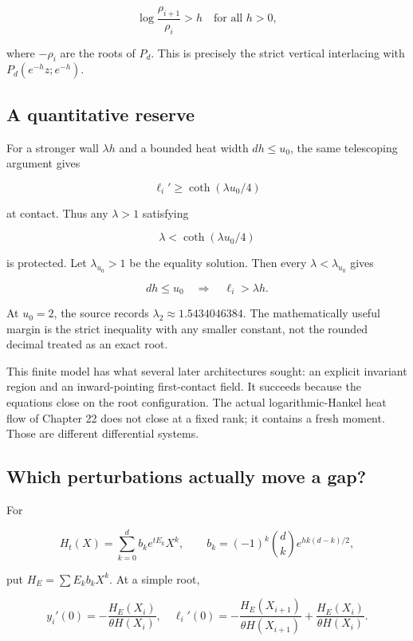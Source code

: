 \documentclass[
  10pt,
  a4paper,
  10pt,
  oneside,
  openany]{book}
\begin{document}
\[
 \log\frac{\rho_{i+1}}{\rho_i}>h
 \quad\text{for all }h>0,
 \tag{30.6}\label{eq:30.6}
\]

where \(-\rho_i\) are the roots of \(P_d\). This is precisely the strict
vertical interlacing with \(P_d(e^{-h}z;e^{-h})\).

\subsection{A quantitative reserve}\label{a-quantitative-reserve}

For a stronger wall \(\lambda h\) and a bounded heat width
\(dh\le u_0\), the same telescoping argument gives

\[
 \ell_i'\ge\coth(\lambda u_0/4)
\]

at contact. Thus any \(\lambda>1\) satisfying

\[
 \lambda<\coth(\lambda u_0/4)
\]

is protected. Let \(\lambda_{u_0}>1\) be the equality solution. Then
every \(\lambda<\lambda_{u_0}\) gives

\[
 dh\le u_0\quad\Longrightarrow\quad\ell_i>\lambda h.
 \tag{30.7}\label{eq:30.7}
\]

At \(u_0=2\), the source records \(\lambda_2\approx1.5434046384\). The
mathematically useful margin is the strict inequality with any smaller
constant, not the rounded decimal treated as an exact root.

This finite model has what several later architectures sought: an
explicit invariant region and an inward-pointing first-contact field. It
succeeds because the equations close on the root configuration. The
actual logarithmic-Hankel heat flow of Chapter 22 does not close at a
fixed rank; it contains a fresh moment. Those are different differential
systems.

\subsection{Which perturbations actually move a
gap?}\label{which-perturbations-actually-move-a-gap}

For

\[
 H_t(X)=\sum_{k=0}^db_ke^{tE_k}X^k,
 \qquad b_k=(-1)^k\binom dk e^{hk(d-k)/2},
\]

put \(H_E=\sum E_kb_kX^k\). At a simple root,

\[
 y_i'(0)=-\frac{H_E(X_i)}{\theta H(X_i)},
 \quad
 \ell_i'(0)=-\frac{H_E(X_{i+1})}{\theta H(X_{i+1})}
 +\frac{H_E(X_i)}{\theta H(X_i)}.
 \tag{30.8}\label{eq:30.8}
\]
\end{document}
